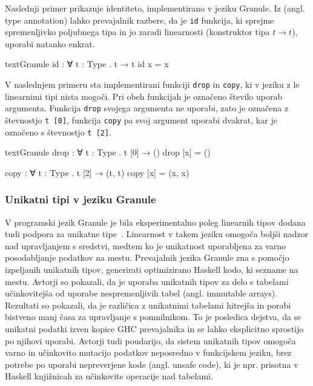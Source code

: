 Naslednji primer prikazuje identiteto, implementirano v jeziku Granule. Iz  (angl. type annotation) lahko prevajalnik razbere, da je \texttt{id} funkcija, ki sprejme spremenljivko poljubnega tipa in jo zaradi linearnosti (konstruktor tipa $t \to t$), uporabi natanko enkrat.

\begin{code-box}{text}{Granule \cmark}
id : ∀ {t : Type} . t → t
id x = x
\end{code-box}

V naslednjem primeru sta implementirani funkciji \texttt{drop} in \texttt{copy}, ki v jeziku z le linearnimi tipi nista mogoči. Pri obeh funkcijah je označeno število uporab argumenta. Funkcija \texttt{drop} svojega argumenta ne uporabi, zato je označena z števnostjo \texttt{t [0]}, funkcija \texttt{copy} pa svoj argument uporabi dvakrat, kar je označeno s števnostjo \texttt{t [2]}.

\begin{code-box}{text}{Granule \cmark}
drop : ∀ {t : Type} . t [0] → ()
drop [x] = ()

copy : ∀ {t : Type} . t [2] → (t, t)
copy [x] = (x, x)
\end{code-box}

\subsubsection{Unikatni tipi v jeziku Granule}
V programski jezik Granule je bila eksperimentalno poleg linearnih tipov dodana tudi podpora za unikatne tipe~\cite{marshall2022linearity}. Linearnost v takem jeziku omogoča boljši nadzor nad upravljanjem s sredstvi, medtem ko je unikatnost uporabljena za varno posodabljanje podatkov na mestu. Prevajalnik jezika Granule zna s pomočjo izpeljanih unikatnih tipov, generirati optimizirano Haskell kodo, ki  sezname na mestu. Avtorji so pokazali, da je uporaba unikatnih tipov za delo s tabelami učinkovitejša od uporabe nespremenljivih tabel (angl. immutable arrays). Rezultati so pokazali, da je različica z unikatnimi tabelami hitrejša in porabi bistveno manj časa za upravljanje s pomnilnikom. To je posledica dejstva, da se unikatni podatki  izven kopice GHC prevajalnika in se lahko eksplicitno sprostijo po njihovi uporabi. Avtorji tudi poudarijo, da sistem unikatnih tipov omogoča varno in učinkovito mutacijo podatkov neposredno v funkcijskem jeziku, brez potrebe po uporabi nepreverjene kode (angl. unsafe code), ki je npr. prisotna v Haskell knjižnicah za učinkovite operacije nad tabelami.

